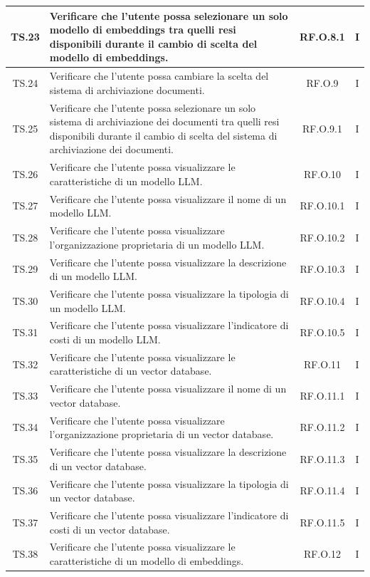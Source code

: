 \documentclass[10pt, a4paper]{article}
\begin{document}
\begin{xltabular}{\textwidth}{|c|X|c|c|}
\hline
TS.23 & Verificare che l'utente possa selezionare un solo modello di embeddings tra quelli resi disponibili durante il cambio di scelta del modello di embeddings. & RF.O.8.1 & I \\
\hline
TS.24 & Verificare che l'utente possa cambiare la scelta del sistema di archiviazione documenti. & RF.O.9 & I \\
\hline
TS.25 & Verificare che l'utente possa selezionare un solo sistema di archiviazione dei documenti tra quelli resi disponibili durante il cambio di scelta del sistema di archiviazione dei documenti. & RF.O.9.1 & I \\
\hline
TS.26 & Verificare che l'utente possa visualizzare le caratteristiche di un modello LLM. & RF.O.10 & I \\
\hline
TS.27 & Verificare che l'utente possa visualizzare il nome di un modello LLM. & RF.O.10.1 & I \\
\hline
TS.28 & Verificare che l'utente possa visualizzare l’organizzazione proprietaria di un modello LLM. & RF.O.10.2 & I \\
\hline
TS.29 & Verificare che l'utente possa visualizzare la descrizione di un modello LLM. & RF.O.10.3 & I \\
\hline
TS.30 & Verificare che l'utente possa visualizzare la tipologia di un modello LLM. & RF.O.10.4 & I \\
\hline
TS.31 & Verificare che l'utente possa visualizzare l’indicatore di costi di un modello LLM. & RF.O.10.5 & I \\
\hline
TS.32 & Verificare che l'utente possa visualizzare le caratteristiche di un vector database. & RF.O.11 & I \\
\hline
TS.33 & Verificare che l'utente possa visualizzare il nome di un vector database. & RF.O.11.1 & I \\
\hline
TS.34 & Verificare che l'utente possa visualizzare l’organizzazione proprietaria di un vector database. & RF.O.11.2 & I \\
\hline
TS.35 & Verificare che l'utente possa visualizzare la descrizione di un vector database. & RF.O.11.3 & I \\
\hline
TS.36 & Verificare che l'utente possa visualizzare la tipologia di un vector database. & RF.O.11.4 & I \\
\hline
TS.37 & Verificare che l'utente possa visualizzare l’indicatore di costi di un vector database. & RF.O.11.5 & I \\
\hline
TS.38 & Verificare che l'utente possa visualizzare le caratteristiche di un modello di embeddings. & RF.O.12 & I \\

\end{xltabular}
\end{document}
